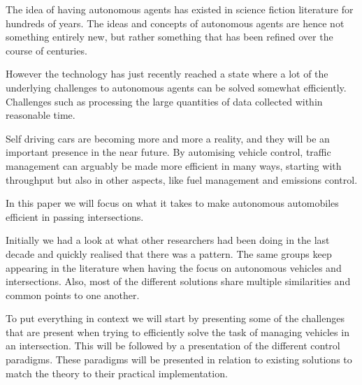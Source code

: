 The idea of having autonomous agents has existed in science fiction literature for hundreds of years.
The ideas and concepts of autonomous agents are hence not something entirely new, but rather something that has been refined over the course of centuries.

However the technology has just recently reached a state where a lot of the underlying challenges to autonomous agents can be solved somewhat efficiently. Challenges such as processing the large quantities of data collected within reasonable time.

Self driving cars are becoming more and more a reality, and they will be an important presence in the near future.
By automising vehicle control, traffic management can arguably be made more efficient in many ways, starting with throughput but also in other aspects, like fuel management and emissions control. 

In this paper we will focus on what it takes to make autonomous automobiles efficient in passing intersections.

Initially we had a look at what other researchers had been doing in the last decade and quickly realised that there was a pattern. 
The same groups keep appearing in the literature when having the focus on autonomous vehicles and intersections.
Also, most of the different solutions share multiple similarities and common points to one another.

To put everything in context we will start by presenting some of the challenges that are present when trying to efficiently solve the task of managing vehicles in an intersection.
This will be followed by a presentation of the different control paradigms.
These paradigms will be presented in relation to existing solutions to match the theory to their practical implementation.
